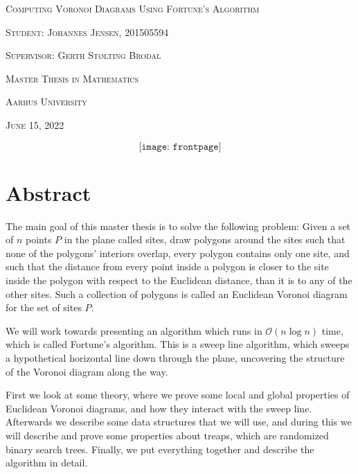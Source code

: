 \documentclass[oneside]{book}
\begin{document}
\begin{titlepage}
\begin{center}
\Huge{\textsc{Computing Voronoi Diagrams Using Fortune's Algorithm}}

\par
\vspace{0.6cm}

\Large{\textsc{Student: Johannes Jensen, 201505594}}

\par
\vspace{0.33cm}

\Large{\textsc{Supervisor: Gerth Stølting Brodal}}

\par
\vspace{0.33cm}

\large{\textsc{Master Thesis in Mathematics}}
\par
\large{\textsc{Aarhus University}}

\par
\vspace{0.25cm}

\normalsize{\textsc{June 15, 2022}}
\end{center}
\[
    \texttt{[image: frontpage]}
\]

\end{titlepage}

\frontmatter
\chapter{Abstract}

The main goal of this master thesis is to solve the following problem: Given a set of $n$ points $P$ in the plane called sites, draw polygons around the sites such that none of the polygons' interiors overlap, every polygon contains only one site, and such that the distance from every point inside a polygon is closer to the site inside the polygon with respect to the Euclidean distance, than it is to any of the other sites. Such a collection of polygons is called an Euclidean Voronoi diagram for the set of sites $P$.

We will work towards presenting an algorithm which runs in $\mathcal{O}(n \log n)$ time, which is called Fortune's algorithm. This is a sweep line algorithm, which sweeps a hypothetical horizontal line down through the plane, uncovering the structure of the Voronoi diagram along the way.

First we look at some theory, where we prove some local and global properties of Euclidean Voronoi diagrams, and how they interact with the sweep line. Afterwards we describe some data structures that we will use, and during this we will describe and prove some properties about treaps, which are randomized binary search trees. Finally, we put everything together and describe the algorithm in detail.
\end{document}

